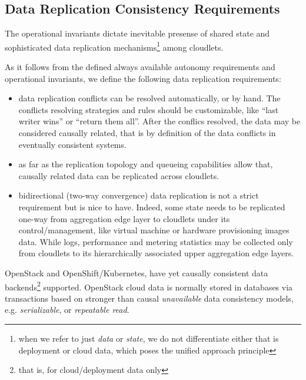 \documentclass[conference]{IEEEtran}
\begin{document}
\subsection{Data Replication Consistency Requirements}

The operational invariants dictate inevitable presense of shared state and
sophisticated data replication mechanisms\footnote{when we refer to just
\textit{data} or \textit{state}, we do not differentiate either that is
deployment or cloud data, which poses the unified approach principle} among
cloudlets.

As it follows from the defined always available autonomy requirements and
operational invariants, we define the following data replication requirements:

\begin{itemize}
  \item data replication conflicts can be resolved automatically, or by hand.
    The conflicts resolving strategies and rules should be customizable, like
    ``last writer wins'' or ``return them all''. After the conflics resolved,
    the data may be considered causally related, that is by definition\cite{b1}
    of the data conflicts in eventually consistent systems.
  \item as far as the replication topology and queueing capabilities allow
    that, causally related data can be replicated across cloudlets.
  \item bidirectional (two-way convergence) data replication is not a strict
    requirement but is nice to have. Indeed, some state needs to be replicated
    one-way from aggregation edge layer to cloudlets under its
    control/management, like virtual machine or hardware provisioning images
    data. While logs, performance and metering statistics may be collected only
    from cloudlets to its hierarchically associated upper aggregation edge
    layers.
\end{itemize}

OpenStack and OpenShift/Kubernetes, have yet causally consistent data
backends\footnote{that is, for cloud/deployment data only} supported.
OpenStack cloud data is normally stored in databases via transactions based on
stronger than causal \textit{unavailable}\cite{b4} data consistency models,
e.g. \textit{serializable}\cite{b4}, or \textit{repeatable read}\cite{b4}.
\end{document}
